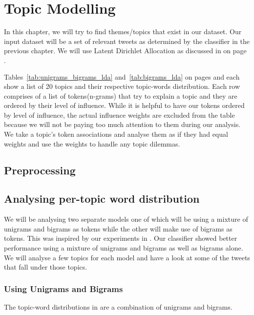 \chapter{Topic Modelling}
\label{cha:topic_modelling}
In this chapter, we will try to find themes/topics that exist in our dataset. Our input dataset will
be a set of relevant tweets as determined by the classifier in the previous chapter. We will use
Latent Dirichlet Allocation as discussed in  on page \pageref{sec:bg_lda}.

Tables~\ref{tab:unigrams_bigrams_lda} and~\ref{tab:bigrams_lda} on pages
\pageref{tab:unigrams_bigrams_lda} and \pageref{tab:bigrams_lda} each show a list of 20 topics and
their respective topic-words distribution. Each row comprises of a list of tokens(n-grams) that try
to explain a topic and they are ordered by their level of influence. While it is helpful to have our
tokens ordered by level of influence, the actual influence weights are excluded from the table
because we will not be paying too much attention to them during our analysis. We take a topic's
token associations and analyse them as if they had equal weights and use the weights to handle any
topic dilemmas.

\section{Preprocessing}
\label{sec:lda_preprocessing}


\section{Analysing per-topic word distribution}
\label{sec:analysing_topic_word_distribution}
We will be analysing two separate models one of which will be using a mixture of unigrams and
bigrams as tokens while the other will make use of bigrams as tokens. This was inspired by our
experiments in . Our classifier showed better performance using
a mixture of unigrams and bigrams as well as bigrams alone. We will analyse a few topics for each
model and have a look at some of the tweets that fall under those topics.

\subsection{Using Unigrams and Bigrams}
\label{sec:unigrams_bigrams_lda}
The topic-word distributions in  are a combination of unigrams
and bigrams.

